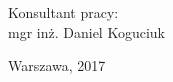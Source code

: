 \begin{center}
\begin{flushright}
		\vspace{1cm}
		
		{\fontsize{14}{14}\selectfont Konsultant pracy: \\ 
		mgr inż. Daniel Koguciuk}
		
	\end{flushright}
	
	\vspace{1cm}
	
	{\fontsize{12}{12}\selectfont Warszawa, 2017}
	
	
\end{center}